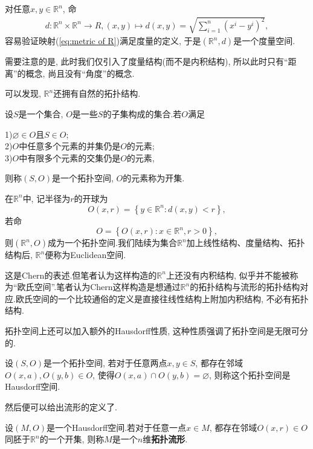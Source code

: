 对任意$x,y\in \mathbb{R}^n$, 命
\begin{equation}\label{eq:metric of R}
  \begin{split}
    d:\mathbb{R}^n\times \mathbb{R}^n\rightarrow R,(x,y)\mapsto d(x,y)=\sqrt{\sum_{i=1}^n(x^i-y^i)^2},
  \end{split}
\end{equation}
容易验证映射(\ref{eq:metric of R})满足度量的定义, 于是$(\mathbb{R}^n,d)$是一个度量空间.
\begin{remark}
  需要注意的是, 此时我们仅引入了度量结构(而不是内积结构), 所以此时只有“距离”的概念, 尚且没有“角度”的概念.
\end{remark}
可以发现, $\mathbb{R}^n$还拥有自然的拓扑结构.
\begin{definition}
  设$S$是一个集合, $O$是一些$S$的子集构成的集合.若$O$满足

  1)$\varnothing\in O$且$S\in O$;\\
  2)$O$中任意多个元素的并集仍是$O$的元素;\\
  3)$O$中有限多个元素的交集仍是$O$的元素,

  则称$(S,O)$是一个拓扑空间, $O$的元素称为开集.
\end{definition}
在$\mathbb{R}^n$中, 记半径为$r$的开球为$$O(x,r)=\left\{y\in\mathbb{R}^n:d(x,y)<r\right\},$$若命
$$O=\left\{O(x,r):x\in\mathbb{R}^n,r>0\right\},$$
则$(\mathbb{R}^n,O)$成为一个拓扑空间.我们陆续为集合$\mathbb{R}^n$加上线性结构、度量结构、拓扑结构后, $\mathbb{R}^n$便称为Euclidean空间.
\begin{remark}
  这是Chern的表述.但笔者认为这样构造的$\mathbb{R}^n$上还没有内积结构, 似乎并不能被称为“欧氏空间”.笔者认为Chern这样构造是想通过$\mathbb{R}^n$的拓扑结构与流形的拓扑结构对应.欧氏空间的一个比较通俗的定义是直接往线性结构上附加内积结构, 不必有拓扑结构.
\end{remark}
拓扑空间上还可以加入额外的Hausdorff性质, 这种性质强调了拓扑空间是无限可分的.
\begin{definition}
  设$(S,O)$是一个拓扑空间, 若对于任意两点$x,y \in S$, 都存在邻域$O(x,a),O(y,b) \in O$, 使得$O(x,a)\cap O(y,b) = \varnothing$, 则称这个拓扑空间是Hausdorff空间.
\end{definition}
然后便可以给出流形的定义了.
\begin{definition}
  设$(M,O)$是一个Hausdorff空间.若对于任意一点$x\in M$, 都存在邻域$O(x,r) \in O$同胚于$\mathbb{R}^n$的一个开集, 则称$M$是一个$n$维\textbf{拓扑流形}.
\end{definition}
